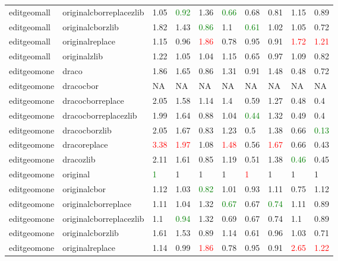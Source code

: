 \begin{landscape}
\begin{longtable}{llllllllll}
editgeomall & originalcborreplacezlib & 1.05 & \textcolor{green}{0.92} & 1.36 & \textcolor{green}{0.66} & 0.68 & 0.81 & 1.15 & 0.89\\
editgeomall & originalcborzlib & 1.82 & 1.43 & \textcolor{green}{0.86} & 1.1 & \textcolor{green}{0.61} & 1.02 & 1.05 & 0.72\\
editgeomall & originalreplace & 1.15 & 0.96 & \textcolor{red}{1.86} & 0.78 & 0.95 & 0.91 & \textcolor{red}{1.72} & \textcolor{red}{1.21}\\
editgeomall & originalzlib & 1.22 & 1.05 & 1.04 & 1.15 & 0.65 & 0.97 & 1.09 & 0.82\\
editgeomone & draco & 1.86 & 1.65 & 0.86 & 1.31 & 0.91 & 1.48 & 0.48 & 0.72\\
editgeomone & dracocbor & NA & NA & NA & NA & NA & NA & NA & NA\\
editgeomone & dracocborreplace & 2.05 & 1.58 & 1.14 & 1.4 & 0.59 & 1.27 & 0.48 & 0.4\\
editgeomone & dracocborreplacezlib & 1.99 & 1.64 & 0.88 & 1.04 & \textcolor{green}{0.44} & 1.32 & 0.49 & 0.4\\
editgeomone & dracocborzlib & 2.05 & 1.67 & 0.83 & 1.23 & 0.5 & 1.38 & 0.66 & \textcolor{green}{0.13}\\
editgeomone & dracoreplace & \textcolor{red}{3.38} & \textcolor{red}{1.97} & 1.08 & \textcolor{red}{1.48} & 0.56 & \textcolor{red}{1.67} & 0.66 & 0.43\\
editgeomone & dracozlib & 2.11 & 1.61 & 0.85 & 1.19 & 0.51 & 1.38 & \textcolor{green}{0.46} & 0.45\\
editgeomone & original & \textcolor{green}{1} & 1 & 1 & 1 & \textcolor{red}{1} & 1 & 1 & 1\\
\rowcolor{lightgray}  editgeomone & originalcbor & 1.12 & 1.03 & \textcolor{green}{0.82} & 1.01 & 0.93 & 1.11 & 0.75 & 1.12\\
\rowcolor{lightgray}  editgeomone & originalcborreplace & 1.11 & 1.04 & 1.32 & \textcolor{green}{0.67} & 0.67 & \textcolor{green}{0.74} & 1.11 & 0.89\\
\rowcolor{lightgray}  editgeomone & originalcborreplacezlib & 1.1 & \textcolor{green}{0.94} & 1.32 & 0.69 & 0.67 & 0.74 & 1.1 & 0.89\\
\rowcolor{lightgray}  editgeomone & originalcborzlib & 1.61 & 1.53 & 0.89 & 1.14 & 0.61 & 0.96 & 1.03 & 0.71\\
\rowcolor{lightgray}  editgeomone & originalreplace & 1.14 & 0.99 & \textcolor{red}{1.86} & 0.78 & 0.95 & 0.91 & \textcolor{red}{2.65} & \textcolor{red}{1.22}\\

\end{longtable}
\end{landscape}
